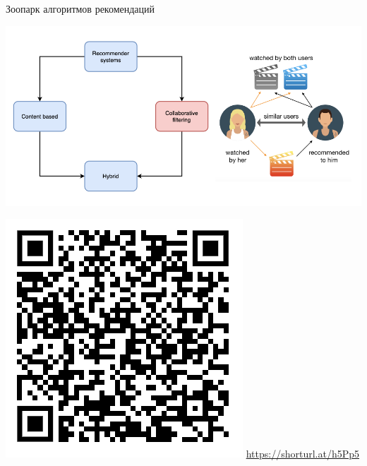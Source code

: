 \documentclass[11pt,aspectratio=169]{beamer}
\begin{document}
\begin{frame}{Зоопарк алгоритмов рекомендаций \cite{ali_2021}}

\begin{center}
\includegraphics[scale=0.27]{images/taxonomy-3.png}
\end{center}

\includegraphics[scale=0.3]{images/poll.png} \hfill \url{https://shorturl.at/h5Pp5}

\end{frame}
\end{document}
